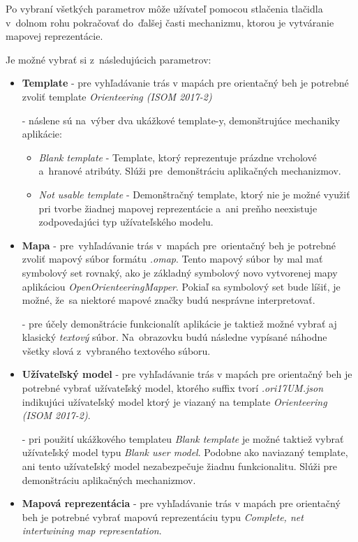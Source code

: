 \documentclass[12pt,a4paper]{report}
\begin{document}
Po vybraní všetkých parametrov môže užívateľ pomocou stlačenia tlačidla v~dolnom rohu pokračovať do~ďalšej časti mechanizmu, ktorou je vytváranie mapovej reprezentácie.

Je možné vybrať si z~následujúcich parametrov:
\begin{itemize}
    \item \textbf{Template} - pre vyhľadávanie trás v mapách pre orientačný beh je potrebné zvoliť template \textit{Orienteering (ISOM 2017-2)} 

    - náslene sú na~výber dva ukážkové template-y, demonštrujúce mechaniky aplikácie:
    \begin{itemize}
        \item \textit{Blank template} - Template, ktorý reprezentuje prázdne vrcholové a~hranové atribúty. Slúži pre~demonštráciu aplikačných mechanizmov.
        \item \textit{Not usable template} - Demonštračný template, ktorý nie je možné využiť pri tvorbe žiadnej mapovej reprezentácie a~ani preňho neexistuje zodpovedajúci typ užívateľského modelu.
    \end{itemize}
    \item \textbf{Mapa} - pre~vyhľadávanie trás v~mapách pre~orientačný beh je potrebné zvoliť mapový súbor formátu \textit{.omap}. Tento mapový súbor by mal mať symbolový set rovnaký, ako je základný symbolový novo vytvorenej mapy aplikáciou \textit{OpenOrienteeringMapper}. Pokiaľ sa symbolový set bude líšiť, je možné, že~sa niektoré mapové značky budú nesprávne interpretovať.
    
    - pre účely demonštrácie funkcionalít aplikácie je taktiež možné vybrať aj klasický \textit{textový} súbor. Na~obrazovku budú následne vypísané náhodne všetky slová z~vybraného textového súboru.
    \item \textbf{Užívateľský model} - pre vyhľadávanie trás v mapách pre orientačný beh je potrebné vybrať užívateľský model, ktorého suffix tvorí \textit{.ori17UM.json} indikujúci užívateľský model ktorý je viazaný na template \textit{Orienteering (ISOM 2017-2)}. 
    
    - pri použití ukážkového templateu \textit{Blank template} je možné taktiež vybrať užívateľský model typu \textit{Blank user model}. Podobne ako naviazaný template, ani tento užívateľský model nezabezpečuje žiadnu funkcionalitu. Slúži pre demonštráciu aplikačných mechanizmov.
    \item \textbf{Mapová reprezentácia} - pre vyhľadávanie trás v mapách pre orientačný beh je potrebné vybrať mapovú reprezentáciu typu \textit{Complete, net intertwining map representation}.


\end{itemize}
\end{document}
